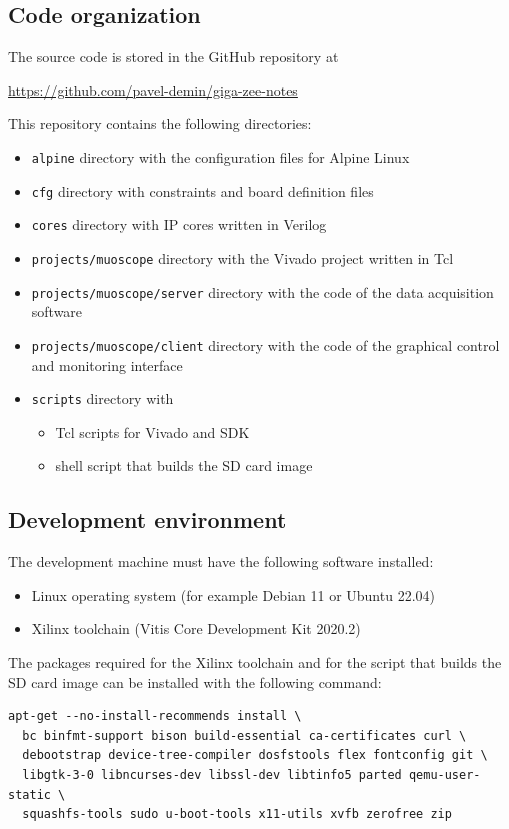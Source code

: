 \documentclass[12pt, a4paper]{article}
\begin{document}
\subsection{Code organization}

The source code is stored in the GitHub repository at

\url{https://github.com/pavel-demin/giga-zee-notes}

This repository contains the following directories:
\begin{itemize}[nosep]
  \item \texttt{alpine} directory with the configuration files for Alpine Linux
  \item \texttt{cfg} directory with constraints and board definition files
  \item \texttt{cores} directory with IP cores written in Verilog
  \item \texttt{projects/muoscope} directory with the Vivado project written in Tcl
  \item \texttt{projects/muoscope/server} directory with the code of the data acquisition software
  \item \texttt{projects/muoscope/client} directory with the code of the graphical control and monitoring interface
  \item \texttt{scripts} directory with
  \begin{itemize}[nosep]
    \item Tcl scripts for Vivado and SDK
    \item shell script that builds the SD card image
  \end{itemize}
\end{itemize}

\subsection{Development environment}

The development machine must have the following software installed:
\begin{itemize}[nosep]
    \item Linux operating system (for example Debian 11 or Ubuntu 22.04)
    \item Xilinx toolchain (Vitis Core Development Kit 2020.2) \cite{vitis}
\end{itemize}

The packages required for the Xilinx toolchain and for the script that builds the SD card image can be installed with the following command:
\vspace{-1ex}
\begin{verbatim}
apt-get --no-install-recommends install \
  bc binfmt-support bison build-essential ca-certificates curl \
  debootstrap device-tree-compiler dosfstools flex fontconfig git \
  libgtk-3-0 libncurses-dev libssl-dev libtinfo5 parted qemu-user-static \
  squashfs-tools sudo u-boot-tools x11-utils xvfb zerofree zip
\end{verbatim}
\end{document}
